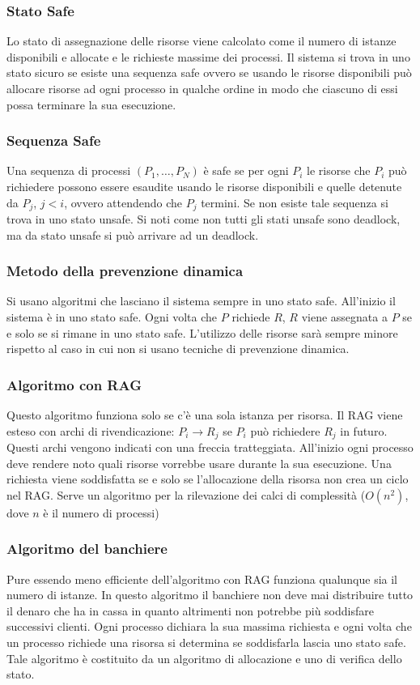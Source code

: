 \subsubsection{Stato Safe}
Lo stato di assegnazione delle risorse viene calcolato come il numero di istanze disponibili e allocate e le richieste massime dei processi. Il sistema si trova in uno stato sicuro
se esiste una sequenza safe ovvero se usando le risorse disponibili pu\`o allocare risorse ad ogni processo in qualche ordine in modo che ciascuno di essi possa terminare la sua
esecuzione. 
\subsubsection{Sequenza Safe}
Una sequenza di processi $(P_1, \dots, P_N)$ \`e safe se per ogni $P_i$ le risorse che $P_i$ pu\`o richiedere possono essere esaudite usando le risorse disponibili e quelle detenute da
$P_j$, $j < i$, ovvero attendendo che $P_j$ termini. Se non esiste tale sequenza si trova in uno stato unsafe. Si noti come non tutti gli stati unsafe sono deadlock, ma da stato 
unsafe si pu\`o arrivare ad un deadlock. 
\subsubsection{Metodo della prevenzione dinamica}
Si usano algoritmi che lasciano il sistema sempre in uno stato safe. All'inizio il sistema \`e in uno stato safe. Ogni volta che $P$ richiede $R$, $R$ viene assegnata a $P$ se e solo
se si rimane in uno stato safe. L'utilizzo delle risorse sar\`a sempre minore rispetto al caso in cui non si usano tecniche di prevenzione dinamica. 
\subsubsection{Algoritmo con RAG}
Questo algoritmo funziona solo se c'\`e una sola istanza per risorsa. Il RAG viene esteso con archi di rivendicazione: $P_i\rightarrow R_j$ se $P_i$ pu\`o richiedere $R_j$ in futuro. 
Questi archi vengono indicati con una freccia tratteggiata. All'inizio ogni processo deve rendere noto quali risorse vorrebbe usare durante la sua esecuzione. Una richiesta viene 
soddisfatta se e solo se l'allocazione della risorsa non crea un ciclo nel RAG. Serve un algoritmo per la rilevazione dei calci di complessit\`a ($O(n^2)$, dove $n$ \`e il numero di 
processi)
\subsubsection{Algoritmo del banchiere}
Pure essendo meno efficiente dell'algoritmo con RAG funziona qualunque sia il numero di istanze. In questo algoritmo il banchiere non deve mai distribuire tutto il denaro che ha in cassa
in quanto altrimenti non potrebbe pi\`u soddisfare successivi clienti. Ogni processo dichiara la sua massima richiesta e ogni volta che un processo richiede una risorsa si determina se 
soddisfarla lascia uno stato safe. Tale algoritmo \`e costituito da un algoritmo di allocazione e uno di verifica dello stato. 

